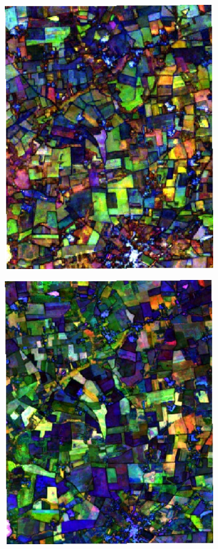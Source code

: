 \documentclass[journal,article,submit,pdftex,moreauthors]{Definitions/mdpi}
\providecommand{\DIFaddbeginFL}{} %
\providecommand{\DIFaddendFL}{} %
\providecommand{\DIFdelbeginFL}{} %
\providecommand{\DIFdelendFL}{} %
\begin{document}
\begin{figure}[H]
\begin{subfigure}[t]{0.23\linewidth}
\DIFdelendFL \DIFaddbeginFL \includegraphics[height=\linewidth,width=0.95\linewidth]{figures/aes_1_layer_mse_results/composites/composite_image_514283.pdf}
    \DIFaddendFL \caption{}
	\DIFdelbeginFL %
\DIFdelendFL \DIFaddbeginFL \label{fig:color_map_g}
	\DIFaddendFL \end{subfigure}
    \begin{subfigure}[t]{0.23\linewidth}
		\centering
	\DIFdelbeginFL %
\DIFdelendFL \DIFaddbeginFL \includegraphics[height=\linewidth,width=0.95\linewidth]{figures/aes_1_layer_mse_results/composites/composite_image_2479133.pdf}

\end{subfigure}
\end{figure}
\end{document}
